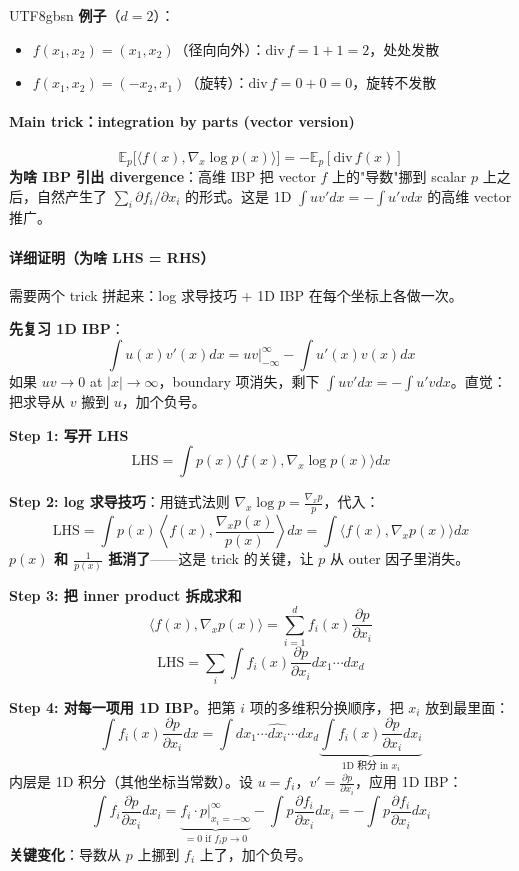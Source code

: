 \documentclass[11pt]{article}
\begin{document}
\begin{CJK}{UTF8}{gbsn}
\textbf{例子}（$d = 2$）：
\begin{itemize}[nosep]
  \item $f(x_1, x_2) = (x_1, x_2)$（径向向外）：$\text{div}\, f = 1 + 1 = 2$，处处发散
  \item $f(x_1, x_2) = (-x_2, x_1)$（旋转）：$\text{div}\, f = 0 + 0 = 0$，旋转不发散
\end{itemize}

\paragraph{Main trick：integration by parts (vector version)}
\[
\mathbb{E}_p\big[\langle f(x), \nabla_x \log p(x) \rangle\big] = -\mathbb{E}_p[\text{div}\, f(x)]
\]
\textbf{为啥 IBP 引出 divergence}：高维 IBP 把 vector $f$ 上的"导数"挪到 scalar $p$ 上之后，自然产生了 $\sum_i \partial f_i / \partial x_i$ 的形式。这是 1D $\int u v' dx = -\int u' v dx$ 的高维 vector 推广。

\paragraph{详细证明（为啥 LHS = RHS）}

需要两个 trick 拼起来：log 求导技巧 + 1D IBP 在每个坐标上各做一次。

\textbf{先复习 1D IBP}：
\[
\int u(x) v'(x) dx = u v \Big|_{-\infty}^\infty - \int u'(x) v(x) dx
\]
如果 $uv \to 0$ at $|x| \to \infty$，boundary 项消失，剩下 $\int u v' dx = -\int u' v dx$。直觉：把求导从 $v$ 搬到 $u$，加个负号。

\textbf{Step 1: 写开 LHS}
\[
\text{LHS} = \int p(x) \langle f(x), \nabla_x \log p(x) \rangle dx
\]

\textbf{Step 2: log 求导技巧}：用链式法则 $\nabla_x \log p = \frac{\nabla_x p}{p}$，代入：
\[
\text{LHS} = \int p(x) \left\langle f(x), \frac{\nabla_x p(x)}{p(x)} \right\rangle dx = \int \langle f(x), \nabla_x p(x) \rangle dx
\]
\textbf{$p(x)$ 和 $\frac{1}{p(x)}$ 抵消了}——这是 trick 的关键，让 $p$ 从 outer 因子里消失。

\textbf{Step 3: 把 inner product 拆成求和}
\[
\langle f(x), \nabla_x p(x) \rangle = \sum_{i=1}^d f_i(x) \frac{\partial p}{\partial x_i}
\]
\[
\text{LHS} = \sum_i \int f_i(x) \frac{\partial p}{\partial x_i} dx_1 \cdots dx_d
\]

\textbf{Step 4: 对每一项用 1D IBP}。把第 $i$ 项的多维积分换顺序，把 $x_i$ 放到最里面：
\[
\int f_i(x) \frac{\partial p}{\partial x_i} dx = \int dx_1 \cdots \widehat{dx_i} \cdots dx_d \underbrace{\int f_i(x) \frac{\partial p}{\partial x_i} dx_i}_{\text{1D 积分 in } x_i}
\]
内层是 1D 积分（其他坐标当常数）。设 $u = f_i$，$v' = \frac{\partial p}{\partial x_i}$，应用 1D IBP：
\[
\int f_i \frac{\partial p}{\partial x_i} dx_i = \underbrace{f_i \cdot p \Big|_{x_i = -\infty}^{\infty}}_{= 0 \text{ if } f_i p \to 0} - \int p \frac{\partial f_i}{\partial x_i} dx_i = -\int p \frac{\partial f_i}{\partial x_i} dx_i
\]
\textbf{关键变化}：导数从 $p$ 上挪到 $f_i$ 上了，加个负号。


\end{CJK}
\end{document}
